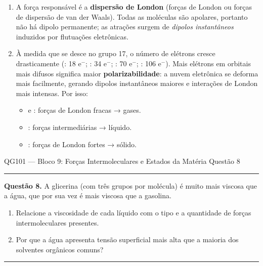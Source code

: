 \documentclass[10pt,a4paper]{article}
\newcommand{\questaoheader}[1]{%
  \begin{center}
  {\small\sffamily QG101 --- Bloco 9: Forças Intermoleculares e Estados da Matéria
  \hfill Questão #1}
  \end{center}
  \vspace{-0.3cm}
  \noindent\rule{\textwidth}{0.6pt}
  \vspace{0.1cm}
}
\newcommand{\resolucaosep}{%
  \vspace{0.4cm}
  \noindent\rule{\textwidth}{0.4pt}
  \vspace{0.1cm}

  \noindent{\bf Resolução:}
  \vspace{0.2cm}
}
\begin{document}
\begin{enumerate}
  \item A força responsável é a \textbf{dispersão de London} (forças de
        London ou forças de dispersão de van der Waals). Todas as moléculas
        são apolares, portanto não há dipolo permanente; as atrações
        surgem de \emph{dipolos instantâneos} induzidos por flutuações
        eletrônicas.

  \item À medida que se desce no grupo 17, o número de elétrons cresce
        drasticamente (: 18 e$^-$; : 34 e$^-$; :
        70 e$^-$; : 106 e$^-$). Mais elétrons em orbitais mais
        difusos significa maior \textbf{polarizabilidade}: a nuvem
        eletrônica se deforma mais facilmente, gerando dipolos instantâneos
        maiores e interações de London mais intensas. Por isso:
        \begin{itemize}
          \item {} e : forças de London fracas → gases.
          \item {}: forças intermediárias → líquido.
          \item {}: forças de London fortes → sólido.
        \end{itemize}
\end{enumerate}

\clearpage

\questaoheader{8}

\noindent\textbf{Questão 8.}
A glicerina (com três grupos  por molécula) é muito mais viscosa
que a água, que por sua vez é mais viscosa que a gasolina.
\begin{enumerate}
  \item Relacione a viscosidade de cada líquido com o tipo e a quantidade
        de forças intermoleculares presentes.
  \item Por que a água apresenta tensão superficial mais alta que a
        maioria dos solventes orgânicos comuns?
\end{enumerate}

\resolucaosep
\end{document}
